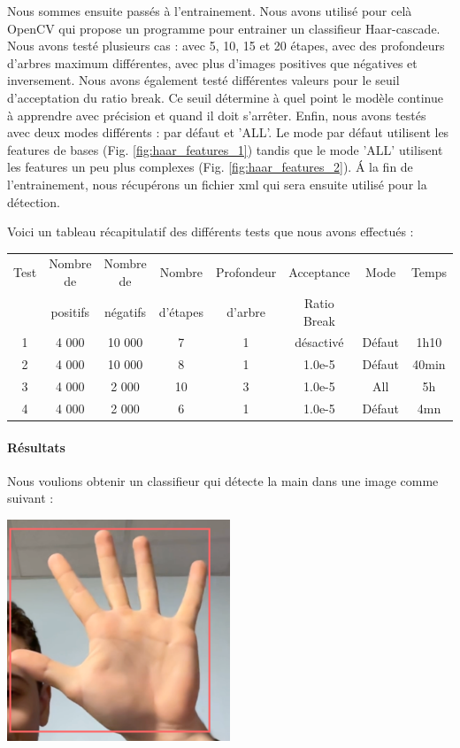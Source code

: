 \documentclass[11pt]{article}
\begin{document}
Nous sommes ensuite passés à l'entrainement. Nous avons utilisé pour celà OpenCV \cite{opencv} qui propose un programme pour entrainer un classifieur Haar-cascade. Nous avons testé plusieurs cas : avec 5, 10, 15 et 20 étapes, avec des profondeurs d'arbres maximum différentes, avec plus d'images positives que négatives et inversement. Nous avons également testé différentes valeurs pour le seuil d'acceptation du ratio break. Ce seuil détermine à quel point le modèle continue à apprendre avec précision et quand il doit s'arrêter. Enfin, nous avons testés avec deux modes différents : par défaut et 'ALL'. Le mode par défaut utilisent les features de bases (Fig. \ref{fig:haar_features_1}) tandis que le mode 'ALL' utilisent les features un peu plus complexes (Fig. \ref{fig:haar_features_2}). \'A la fin de l'entrainement, nous récupérons un fichier xml qui sera ensuite utilisé pour la détection.\bigbreak

\bigbreak

\noindent Voici un tableau récapitulatif des différents tests que nous avons effectués : \bigbreak

\begin{center} 
    \begin{tabular}{|c|c|c|c|c|c|c|c|}
        \hline
        Test & Nombre de & Nombre de & Nombre & Profondeur & Acceptance  & Mode & Temps \\
        & positifs & négatifs & d'étapes & d'arbre & Ratio Break &  &  \\ 
        \hline 
        1 & 4 000 & 10 000 & 7 & 1 & désactivé & Défaut & 1h10 \\ 
        \hline
        2 & 4 000 & 10 000 & 8 & 1 & 1.0e-5 & Défaut & 40min \\
        \hline
        3 & 4 000 & 2 000 & 10 & 3 & 1.0e-5 & All & 5h \\
        \hline
        4 & 4 000 & 2 000 & 6 & 1 & 1.0e-5 & Défaut & 4mn \\
        \hline
    \end{tabular}
\end{center}

\bigbreak

\paragraph{Résultats}
Nous voulions obtenir un classifieur qui détecte la main dans une image comme suivant : 
\begin{center}
    \includegraphics[width=0.5\textwidth]{images/res_attendu.png}
\end{center}
\end{document}
